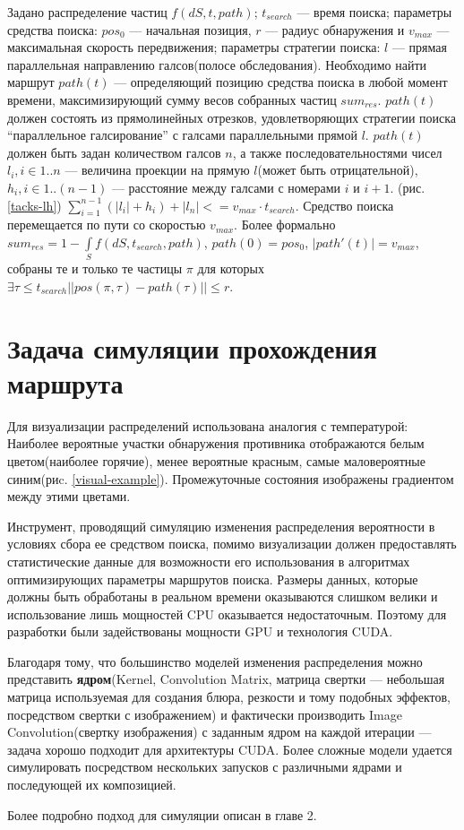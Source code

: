Задано распределение частиц $f(dS, t, path)$; $t_{search}$ --- время поиска;
параметры средства поиска: $pos_0$ --- начальная позиция, $r$ --- радиус обнаружения и 
$v_{max}$ --- максимальная скорость передвижения; параметры стратегии поиска: $l$ --- прямая
параллельная направлению галсов(полосе обследования).
 Необходимо найти маршрут $path(t)$ --- определяющий
позицию средства поиска в любой момент времени, максимизирующий сумму весов собранных
частиц $sum_{res}$. $path(t)$ должен состоять из прямолинейных отрезков, удовлетворяющих
стратегии поиска ``параллельное галсирование'' с галсами параллельными прямой $l$.
$path(t)$ должен быть задан количеством галсов $n$, а также последовательностями чисел
$l_i, i \in 1..n$ --- величина проекции на прямую $l$(может быть отрицательной),
$h_i, i \in 1..(n-1)$ --- расстояние между галсами с номерами $i$ и $i+1$. (рис. \ref{tacks-lh})
$\sum\limits_{i=1}^{n-1} (|l_i|+h_i) + |l_n| <= v_{max} \cdot t_{search}$. Средство поиска 
перемещается по пути со скоростью $v_{max}$.
Более формально $sum_{res}=1-\int\limits_Sf(dS, t_{search}, path)$, $path(0)=pos_0$,
$|path'(t)| = v_{max}$, собраны те и только те частицы
$\pi$ для которых $\exists \tau\le t_{search} ||pos(\pi, \tau)-path(\tau)|| \le r$. 

\FloatBarrier
\section{Задача симуляции прохождения маршрута}
Для визуализации распределений использована аналогия с температурой: Наиболее вероятные
участки обнаружения противника отображаются белым цветом(наиболее горячие), менее вероятные красным,
самые маловероятные синим(риc. \ref{visual-example}).
Промежуточные состояния изображены градиентом между этими цветами.


Инструмент, проводящий симуляцию изменения распределения вероятности в условиях сбора ее средством
поиска, помимо визуализации должен предоставлять статистические данные для возможности его
использования в алгоритмах оптимизирующих параметры маршрутов поиска. Размеры данных, которые 
должны быть обработаны в реальном времени оказываются слишком велики и использование лишь мощностей
CPU оказывается недостаточным. Поэтому для разработки были задействованы мощности GPU и технология
CUDA. 

Благодаря тому, что большинство моделей изменения распределения можно представить
\textbf{ядром}(Kernel, Convolution Matrix, матрица свертки --- небольшая матрица используемая для 
создания блюра, резкости и тому подобных эффектов, посредством свертки с изображением)
 и фактически производить Image Convolution(свертку изображения) с заданным ядром на каждой итерации
 --- задача хорошо подходит для архитектуры CUDA.
 Более сложные модели удается симулировать посредством нескольких запусков с различными ядрами и
последующей их композицией.

 Более подробно подход для симуляции описан в главе 2.

\FloatBarrier
